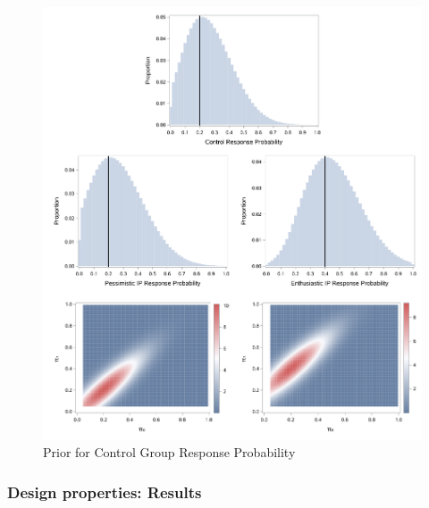 \documentclass[12pt]{article}
\begin{document}
		\begin{figure}
      \centering\includegraphics[scale=0.70]{./FIGURES/BINARY-PRIORS.pdf}
      \caption{Prior for Control Group Response Probability \label{fig:pmp}}
    \end{figure}	
\newpage
\subsubsection{Design properties: Results}
%
%
\end{document}
